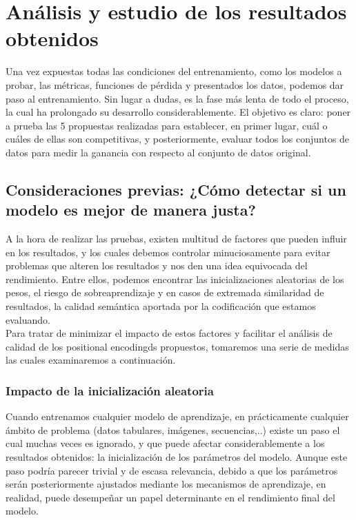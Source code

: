 \chapter{Análisis y estudio de los resultados obtenidos}

Una vez expuestas todas las condiciones del entrenamiento, como los modelos a probar, las métricas, funciones de pérdida y presentados los datos, podemos dar paso al entrenamiento. Sin lugar a dudas, es la fase más lenta de todo el proceso, la cual ha prolongado su desarrollo considerablemente. El objetivo es claro: poner a prueba las 5 propuestas realizadas para establecer, en primer lugar, cuál o cuáles de ellas son competitivas, y posteriormente, evaluar todos los conjuntos de datos para medir la ganancia con respecto al conjunto de datos original.

\section{Consideraciones previas: ¿Cómo detectar si un modelo es mejor de manera justa?}

A la hora de realizar las pruebas, existen multitud de factores que pueden influir en los resultados, y los cuales debemos controlar minuciosamente para evitar problemas que alteren los resultados y nos den una idea equivocada del rendimiento. Entre ellos, podemos encontrar las inicializaciones aleatorias de los pesos, el riesgo de sobreaprendizaje y en casos de extremada similaridad de resultados, la calidad semántica aportada por la codificación que estamos evaluando.\\

Para tratar de minimizar el impacto de estos factores y facilitar el análisis de calidad de los positional encodingds propuestos, tomaremos una serie de medidas las cuales examinaremos a continuación.

\subsection{Impacto de la inicialización aleatoria}

Cuando entrenamos cualquier modelo de aprendizaje, en prácticamente cualquier ámbito de problema (datos tabulares, imágenes, secuencias,..) existe un paso el cual muchas veces es ignorado, y que puede afectar considerablemente a los resultados obtenidos: la inicialización de los parámetros del modelo. Aunque este paso podría parecer trivial y de escasa relevancia, debido a que los parámetros serán posteriormente ajustados mediante los mecanismos de aprendizaje, en realidad, puede desempeñar un papel determinante en el rendimiento final del modelo.\\

